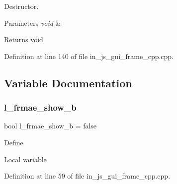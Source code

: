 Destructor. 


\begin{DoxyParams}{Parameters}
{\em void} & \\
\hline
\end{DoxyParams}
\begin{DoxyReturn}{Returns}
void 
\end{DoxyReturn}


Definition at line 140 of file in\+\_\+js\+\_\+gui\+\_\+frame\+\_\+cpp.\+cpp.



\subsection{Variable Documentation}
\mbox{\label{group___g_u_i_ga1abd408fef2ab9bfeafa4b963d2e4119}} 
\subsubsection{l\_frmae\_show\_b}
{\footnotesize\ttfamily bool l\+\_\+frmae\+\_\+show\+\_\+b = false}

Define

Local variable 

Definition at line 59 of file in\+\_\+js\+\_\+gui\+\_\+frame\+\_\+cpp.\+cpp.

